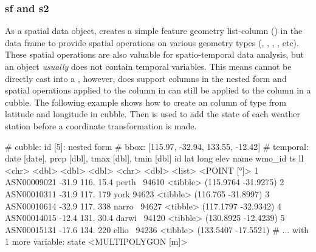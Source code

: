 \documentclass[
]{jss}
\begin{document}
\hypertarget{sf-and-s2}{%
\subsubsection{sf and s2}\label{sf-and-s2}}

As a spatial data object,  creates a simple feature geometry list-column () in the data frame to provide spatial operations on various geometry types (, , , , etc). These spatial operations are also valuable for spatio-temporal data analysis, but an  object \emph{usually} does not contain temporal variables. This means  cannot be directly cast into a , however,  does support  columns in the nested form and spatial operations applied to the  column in  can still be applied to the  column in a cubble. The following example shows how to create an  column of  type from latitude and longitude in cubble. Then  is used to add the state  of each weather station before a coordinate transformation is made.

\begin{CodeChunk}
\begin{CodeOutput}
# cubble:   id [5]: nested form
# bbox:     [115.97, -32.94, 133.55, -12.42]
# temporal: date [date], prcp [dbl], tmax [dbl], tmin [dbl]
  id            lat  long  elev name   wmo_id ts                        ll
  <chr>       <dbl> <dbl> <dbl> <chr>   <dbl> <list>           <POINT [°]>
1 ASN00009021 -31.9  116.  15.4 perth~  94610 <tibble> (115.9764 -31.9275)
2 ASN00010311 -31.9  117. 179   york    94623 <tibble>  (116.765 -31.8997)
3 ASN00010614 -32.9  117. 338   narro~  94627 <tibble> (117.1797 -32.9342)
4 ASN00014015 -12.4  131.  30.4 darwi~  94120 <tibble> (130.8925 -12.4239)
5 ASN00015131 -17.6  134. 220   ellio~  94236 <tibble> (133.5407 -17.5521)
# ... with 1 more variable: state <MULTIPOLYGON [m]>
\end{CodeOutput}
\end{CodeChunk}
\end{document}
